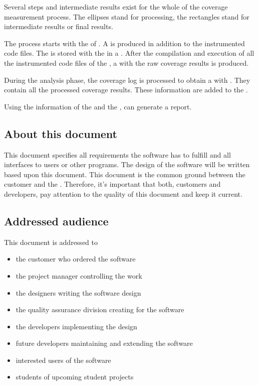 \par
Several steps and intermediate results exist for the whole of the coverage measurement process. The ellipses stand for processing, the rectangles stand for intermediate results or final results.
\par
The process starts with the  of . A  is produced in addition to the instrumented code files. The  is stored with the  in a . After the compilation and execution of all the instrumented code files of the , a  with the raw coverage results is produced.
\par
During the analysis phase, the coverage log is processed to obtain a  with . They contain all the processed coverage results. These information are added to the .
\par
Using the information of the  and the , \gbt can generate a  report.

\subsection{About this document} \label{in:AboutThisDocument}
This document specifies all requirements the software has to fulfill and all interfaces to users or other programs. The design of the software will be written based upon this document. This document is the common ground between the customer and the . Therefore, it's important that both, customers and developers, pay attention to the quality of this document and keep it current.

\subsection{Addressed audience} \label{in:Addressed audience}
This document is addressed to
\begin{itemize}
  \item the customer who ordered the software
  \item the project manager controlling the work
  \item the designers writing the software design
  \item the quality assurance division creating  for the software
  \item the developers implementing the design
  \item future developers maintaining and extending the software
  \item interested users of the software
  \item students of upcoming student projects
\end{itemize}

